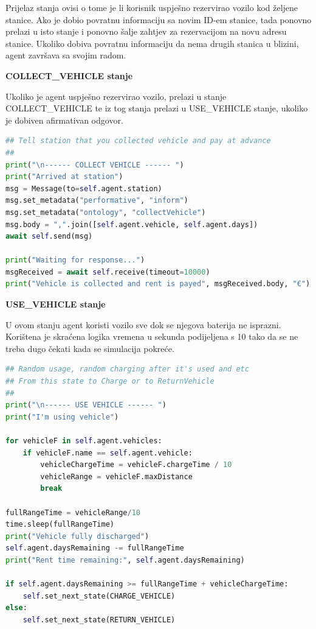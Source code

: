 \documentclass{foi}
\begin{document}
Prijelaz stanja ovisi o tome je li korisnik uspješno rezervirao vozilo kod željene stanice. Ako je dobio povratnu informaciju sa novim ID-em stanice, tada ponovno prelazi u isto stanje i ponovno šalje zahtjev za rezervacijom na novu adresu stanice. Ukoliko dobiva povratnu informaciju da nema drugih stanica u blizini, agent završava sa svojim radom.

\begin{flushleft}\textbf{COLLECT\_VEHICLE stanje}\end{flushleft}

Ukoliko je agent uspješno rezervirao vozilo, prelazi u stanje COLLECT\_VEHICLE te iz tog stanja prelazi u USE\_VEHICLE stanje, ukoliko je dobiven afirmativan odgovor.

\begin{lstlisting}[language=Python]
## Tell station that you collected vehicle and pay at advance
##
print("\n------ COLLECT VEHICLE ------ ")
print("Arrived at station")
msg = Message(to=self.agent.station)
msg.set_metadata("performative", "inform")
msg.set_metadata("ontology", "collectVehicle")
msg.body = ",".join([self.agent.vehicle, self.agent.days])
await self.send(msg)

print("Waiting for response...")
msgReceived = await self.receive(timeout=10000)
print("Vehicle is collected and rent is payed", msgReceived.body, "€")
\end{lstlisting}

\begin{flushleft}\textbf{USE\_VEHICLE stanje}\end{flushleft}

U ovom stanju agent koristi vozilo sve dok se njegova baterija ne isprazni. Korištena je skraćena logika vremena u sekunda podijeljena s 10 tako da se ne treba dugo čekati kada se simulacija pokreće. 

\begin{lstlisting}[language=Python]
## Random usage, random charging after it's used and etc
## From this state to Charge or to ReturnVehicle
##
print("\n------ USE VEHICLE ------ ")
print("I'm using vehicle")

for vehicleF in self.agent.vehicles:
	if vehicleF.name == self.agent.vehicle:
		vehicleChargeTime = vehicleF.chargeTime / 10
		vehicleRange = vehicleF.maxDistance
		break

fullRangeTime = vehicleRange/10
time.sleep(fullRangeTime)
print("Vehicle fully discharged")
self.agent.daysRemaining -= fullRangeTime
print("Rent time remaining:", self.agent.daysRemaining)

if self.agent.daysRemaining >= fullRangeTime + vehicleChargeTime:
	self.set_next_state(CHARGE_VEHICLE)    
else:
	self.set_next_state(RETURN_VEHICLE)    
\end{lstlisting}
\end{document}
